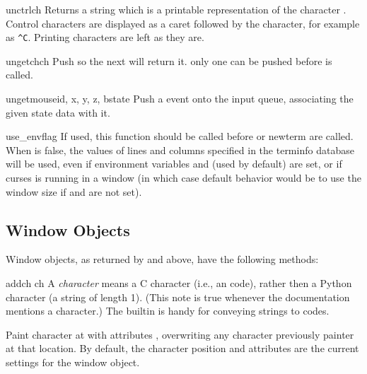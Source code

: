 \begin{funcdesc}{unctrl}{ch}
Returns a string which is a printable representation of the character
.  Control characters are displayed as a caret followed by the
character, for example as \verb|^C|. Printing characters are left as they
are.
\end{funcdesc}

\begin{funcdesc}{ungetch}{ch}
Push  so the next  will return it.
 only one  can be pushed before 
is called.
\end{funcdesc}

\begin{funcdesc}{ungetmouse}{id, x, y, z, bstate}
Push a  event onto the input queue, associating
the given state data with it.
\end{funcdesc}

\begin{funcdesc}{use_env}{flag}
If used, this function should be called before  or
newterm are called.  When  is false, the values of
lines and columns specified in the terminfo database will be
used, even if environment variables  and
 (used by default) are set, or if curses is running in
a window (in which case default behavior would be to use the window
size if  and  are not set).
\end{funcdesc}

\subsection{Window Objects \label{curses-window-objects}}

Window objects, as returned by  and
 above, have the
following methods:

\begin{methoddesc}{addch}{ ch}
 A \emph{character} means a C character (i.e., an
\ASCII{} code), rather then a Python character (a string of length 1).
(This note is true whenever the documentation mentions a character.)
The builtin  is handy for conveying strings to codes.

Paint character  at  with attributes
, overwriting any character previously painter at that
location.  By default, the character position and attributes are the
current settings for the window object.
\end{methoddesc}

